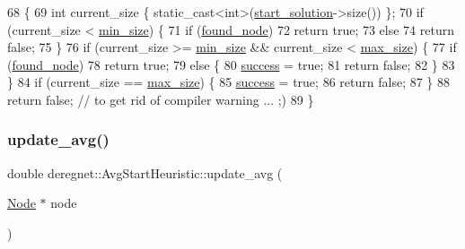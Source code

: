 \begin{DoxyCode}
68                                        \{
69     \textcolor{keywordtype}{int} current\_size \{ \textcolor{keyword}{static\_cast<}\textcolor{keywordtype}{int}\textcolor{keyword}{>}(\hyperlink{classderegnet_1_1DeregnetStartHeuristic_a7450e11ca0a265b055f95e7832b65e2f}{start\_solution}->size()) \};
70     \textcolor{keywordflow}{if} (current\_size < \hyperlink{classderegnet_1_1AvgStartHeuristic_a3abc4d801d4eb1fdb8ecfed7077045b3}{min\_size}) \{
71         \textcolor{keywordflow}{if} (\hyperlink{classderegnet_1_1DeregnetStartHeuristic_a1ca705794583fb3b6e563efeceb4445e}{found\_node})
72             \textcolor{keywordflow}{return} \textcolor{keyword}{true};
73         \textcolor{keywordflow}{else}
74             \textcolor{keywordflow}{return} \textcolor{keyword}{false};
75     \}
76     \textcolor{keywordflow}{if} (current\_size >= \hyperlink{classderegnet_1_1AvgStartHeuristic_a3abc4d801d4eb1fdb8ecfed7077045b3}{min\_size} && current\_size < \hyperlink{classderegnet_1_1AvgStartHeuristic_a4794e58ea33d94f9029defa3a31cc573}{max\_size}) \{
77         \textcolor{keywordflow}{if} (\hyperlink{classderegnet_1_1DeregnetStartHeuristic_a1ca705794583fb3b6e563efeceb4445e}{found\_node})
78             \textcolor{keywordflow}{return} \textcolor{keyword}{true};
79         \textcolor{keywordflow}{else} \{
80             \hyperlink{classderegnet_1_1DeregnetStartHeuristic_a72fd16ee027f6aa973f1ff29746addba}{success} = \textcolor{keyword}{true};
81             \textcolor{keywordflow}{return} \textcolor{keyword}{false};
82         \}
83     \}
84     \textcolor{keywordflow}{if} (current\_size == \hyperlink{classderegnet_1_1AvgStartHeuristic_a4794e58ea33d94f9029defa3a31cc573}{max\_size}) \{
85         \hyperlink{classderegnet_1_1DeregnetStartHeuristic_a72fd16ee027f6aa973f1ff29746addba}{success} = \textcolor{keyword}{true};
86         \textcolor{keywordflow}{return} \textcolor{keyword}{false};
87     \}
88     \textcolor{keywordflow}{return} \textcolor{keyword}{false};   \textcolor{comment}{// to get rid of compiler warning ... ;)}
89 \}
\end{DoxyCode}
\mbox{\label{classderegnet_1_1AvgStartHeuristic_ab3cbc873952af7525654194a7d5e59e0}} 
\subsubsection{\texorpdfstring{update\+\_\+avg()}{update\_avg()}}
{\footnotesize\ttfamily double deregnet\+::\+Avg\+Start\+Heuristic\+::update\+\_\+avg (\begin{DoxyParamCaption}\item[{\hyperlink{namespacederegnet_a744bad34f2de9856d36715a445f027f3}{Node} $\ast$}]{node }\end{DoxyParamCaption})\hspace{0.3cm}{\ttfamily [private]}}



